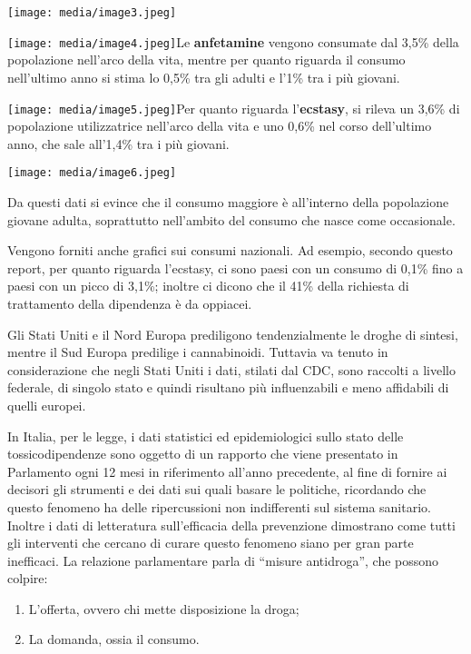 \documentclass[]{article}
\begin{document}
\texttt{[image: media/image3.jpeg]}

\texttt{[image: media/image4.jpeg]}Le \textbf{anfetamine} vengono
consumate dal 3,5\% della popolazione nell'arco della vita, mentre per
quanto riguarda il consumo nell'ultimo anno si stima lo 0,5\% tra gli
adulti e l'1\% tra i più giovani.

\texttt{[image: media/image5.jpeg]}Per quanto riguarda
l'\textbf{ecstasy}, si rileva un 3,6\% di popolazione utilizzatrice
nell'arco della vita e uno 0,6\% nel corso dell'ultimo anno, che sale
all'1,4\% tra i più giovani.

\texttt{[image: media/image6.jpeg]}

Da questi dati si evince che il consumo maggiore è all'interno della
popolazione giovane adulta, soprattutto nell'ambito del consumo che
nasce come occasionale.

Vengono forniti anche grafici sui consumi nazionali. Ad esempio, secondo
questo report, per quanto riguarda l'ecstasy, ci sono paesi con un
consumo di 0,1\% fino a paesi con un picco di 3,1\%; inoltre ci dicono
che il 41\% della richiesta di trattamento della dipendenza è da
oppiacei.

Gli Stati Uniti e il Nord Europa prediligono tendenzialmente le droghe
di sintesi, mentre il Sud Europa predilige i cannabinoidi. Tuttavia va
tenuto in considerazione che negli Stati Uniti i dati, stilati dal CDC,
sono raccolti a livello federale, di singolo stato e quindi risultano
più influenzabili e meno affidabili di quelli europei.

In Italia, per le legge, i dati statistici ed epidemiologici sullo stato
delle tossicodipendenze sono oggetto di un rapporto che viene presentato
in Parlamento ogni 12 mesi in riferimento all'anno precedente, al fine
di fornire ai decisori gli strumenti e dei dati sui quali basare le
politiche, ricordando che questo fenomeno ha delle ripercussioni non
indifferenti sul sistema sanitario. Inoltre i dati di letteratura
sull'efficacia della prevenzione dimostrano come tutti gli interventi
che cercano di curare questo fenomeno siano per gran parte inefficaci.
La relazione parlamentare parla di ``misure antidroga'', che possono
colpire:

\begin{enumerate}
\def\labelenumi{\arabic{enumi}.}
\item
  L'offerta, ovvero chi mette disposizione la droga;
\item
  La domanda, ossia il consumo.
\end{enumerate}
\end{document}
